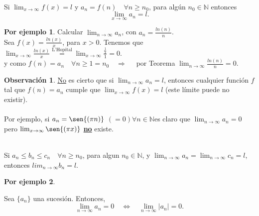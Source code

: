 \documentclass{article}
\theoremstyle{definition}
\theoremstyle{definition}
\newtheorem*{obs}{Observación}
\newtheorem*{ej}{Por ejemplo}
\theoremstyle{remark}
\begin{document}
\begin{teo} \; \\
Si $\lim_{x \to \infty }{f(x)}=l$ y $a_n=f(n) \quad \forall n \geq n_0$, para algún $n_0 \in \mathbb{N}$ entonces \[
  \lim_{x\to\infty}{a_n}=l.
\]

\end{teo}
\begin{ej}
  Calcular $\lim_{n \to \infty}{a_n}$, con $a_n=\frac{ln(n)}{n}$. \\
  Sea $f(x)=\frac{ln(x)}{x}$, para $x>0$. Tenemos que $\lim_{x \to \infty}{\frac{ln(x)}{x}} \overset{\text{L'Hopital}}{=} \lim_{x \to \infty}{\frac{\frac{1}{x}}{1}}=0.$ \\
  y como $f(n)=a_n \quad \forall n \geq 1=n_0 \quad \Rightarrow \quad$ por Teorema $\lim_{n \to \infty }{\frac{ln(n)}{n}}=0$.
\end{ej}
\begin{obs}
  \underline{No} es cierto que si $\lim_{n \to \infty}{a_n}=l$, entonces cualquier función $f$ tal que $f(n)=a_n$ cumple que $\lim_{x \to \infty }{f(x)}=l$ (este límite puede no existir). \\\\
  Por ejemplo, si $a_n=\sen{(\pi n)}$ $(=0) \forall n \in \mathbb{N}$es claro que $\lim_{n \to \infty}{a_n=0}$ pero $\lim_{x \to \infty}{\sen{(\pi x)}}$ \underline{\textbf{no}} existe.
\end{obs}

\pagebreak

\begin{teo} \; \\
  Si $a_n \leq b_n \leq c_n \quad \forall n \geq n_0$, para algun $n_0 \in \mathbb{N}$, y $\lim_{n \to \infty}{a_n}=\lim_{n \to \infty}{c_n}=l$, entonces $lim_{n \to \infty}{b_n}=l$.
\end{teo}

\begin{figure}[h]
\centering
\def\svgwidth{0.75\textwidth}

\end{figure}

\begin{ej} \; \\

\end{ej}

\begin{teo}
Sea $\{ a_n \}$ una sucesión. Entonces, $$\lim_{n \to \infty } a_n = 0 \quad \Leftrightarrow \quad \lim_{n \to \infty } |a_n| = 0.$$
\end{teo}
\end{document}
